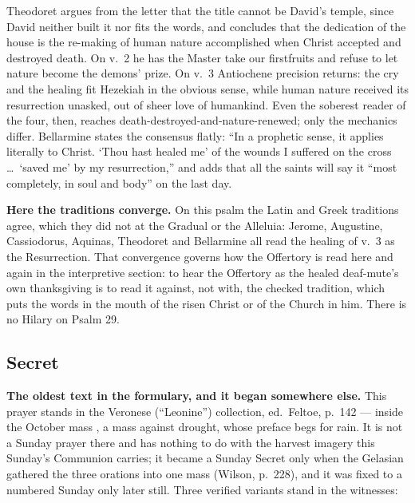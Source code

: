 \begin{witnessnote}
Theodoret argues from the letter that the title cannot be David's temple, since
David neither built it nor fits the words, and concludes that the dedication of
the house is the re-making of human nature accomplished when Christ accepted
and destroyed death. On v.~2 he has the Master take our firstfruits and refuse
to let nature become the demons' prize. On v.~3 Antiochene precision returns:
the cry and the healing fit Hezekiah in the obvious sense, while human nature
received its resurrection unasked, out of sheer love of humankind. Even the
soberest reader of the four, then, reaches death-destroyed-and-nature-renewed;
only the mechanics differ. Bellarmine states the consensus flatly: ``In a
prophetic sense, it applies literally to Christ. `Thou hast healed me' of the
wounds I suffered on the cross \dots\ `saved me' by my resurrection,'' and adds
that all the saints will say it ``most completely, in soul and body'' on the
last day.
\end{witnessnote}

\textbf{Here the traditions converge.} On this psalm the Latin and Greek
traditions agree, which they did not at the Gradual or the Alleluia: Jerome,
Augustine, Cassiodorus, Aquinas, Theodoret and Bellarmine all read the healing
of v.~3 as the Resurrection. That convergence governs how the Offertory is
read here and again in the interpretive section: to hear the Offertory as the healed
deaf-mute's own thanksgiving is to read it against, not with, the checked
tradition, which puts the words in the mouth of the risen Christ or of the
Church in him. There is no Hilary on Psalm 29.

\elementguard
\subsection*{Secret }


\textbf{The oldest text in the formulary, and it began somewhere else.} This
prayer stands in the Veronese (``Leonine'') collection, ed.\ Feltoe, p.~142 ---
inside the October mass , a mass against drought,
whose preface begs for rain. It is not a Sunday prayer there and has nothing to
do with the harvest imagery this Sunday's Communion carries; it became a Sunday
Secret only when the Gelasian gathered the three orations into one mass
(Wilson, p.~228), and it was fixed to a numbered Sunday only later still. Three
verified variants stand in the witnesses:

